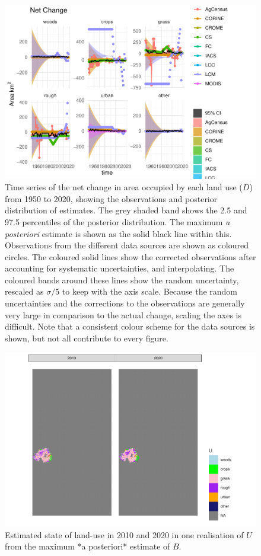 \documentclass[
]{book}
\begin{document}
\begin{figure}
\centering
\includegraphics{Results_ni_files/figure-latex/plotD-1.pdf}
\caption{\label{fig:plotD} Time series of the net change in area occupied by each land use (\(D\)) from 1950 to 2020, showing the observations and posterior distribution of estimates. The grey shaded band shows the 2.5 and 97.5 percentiles of the posterior distribution. The maximum \emph{a posteriori} estimate is shown as the solid black line within this. Observations from the different data sources are shown as coloured circles. The coloured solid lines show the corrected observations after accounting for systematic uncertainties, and interpolating. The coloured bands around these lines show the random uncertainty, rescaled as \(\sigma /5\) to keep with the axis scale. Because the random uncertainties and the corrections to the observations are generally very large in comparison to the actual change, scaling the axes is difficult. Note that a consistent colour scheme for the data sources is shown, but not all contribute to every figure.}
\end{figure}

\begin{figure}
\includegraphics[width=1.3\linewidth]{Results_ni_files/figure-latex/plotUt-1} \caption{Estimated state of land-use in 2010 and 2020 in one realisation of $U$ from the maximum *a posteriori* estimate of $B$.}\label{fig:plotUt}
\end{figure}
\end{document}
